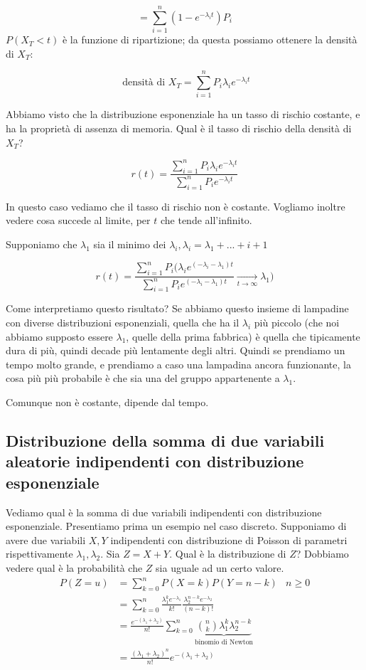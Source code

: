 \documentclass[a4paper,12pt]{book}
\begin{document}
$$ = \sum_{i=1}^{n} (1 - e^{-\lambda_i t}) P_i $$
$ P(X_T < t) $ è la funzione di ripartizione; da questa possiamo ottenere la densità di $ X_T $:

$$ \text{ densità di } X_T = \sum_{i=1}^{n} P_i \lambda_i e^{-\lambda_i t}$$

Abbiamo visto che la distribuzione esponenziale ha un tasso di rischio costante, e ha la proprietà di assenza di memoria. Qual è il tasso di rischio della densità di $ X_T $?

$$ r(t) = \frac{\sum_{i = 1}^{n} P_i \lambda_i e^{-\lambda_i t}}
			   {\sum_{i = 1}^{n} P_i e^{-\lambda_i t}} $$

In questo caso vediamo che il tasso di rischio non è costante. Vogliamo inoltre vedere cosa succede al limite, per $ t $ che tende all'infinito. 

Supponiamo che $\lambda_1$ sia il minimo dei $\lambda_i, \lambda_i = \lambda_1 + ... + i + 1$ 

$$ r(t) = \frac{\sum_{i = 1}^{n} P_i(\lambda_i e ^{(-\lambda_i - \lambda_1) t }}
{\sum_{i = 1}^{n} P_i e ^{(-\lambda_i - \lambda_1) t }} \underset{t \to \infty}{\longrightarrow} \lambda_1) $$

Come interpretiamo questo risultato? Se abbiamo questo insieme di lampadine con diverse distribuzioni esponenziali, quella che ha il $ \lambda_i $ più piccolo (che noi abbiamo supposto essere $\lambda_1$, quelle della prima fabbrica) è quella che tipicamente dura di più, quindi decade più lentamente degli altri. Quindi se prendiamo un tempo molto grande, e prendiamo a caso una lampadina ancora funzionante, la cosa più più probabile è che sia una del gruppo appartenente a $ \lambda_1 $.

Comunque non è costante, dipende dal tempo. 

\subsection{Distribuzione della somma di due variabili aleatorie indipendenti con distribuzione esponenziale}

Vediamo qual è la somma di due variabili indipendenti con distribuzione esponenziale. Presentiamo prima un esempio nel caso discreto. Supponiamo di avere due variabili $ X, Y $ indipendenti con distribuzione di Poisson di parametri rispettivamente $\lambda_1, \lambda_2$. Sia $ Z = X + Y $. Qual è la distribuzione di $ Z $? Dobbiamo vedere qual è la probabilità che $ Z $ sia uguale ad un certo valore. 
\begin{align*}
	P(Z = u) & = \sum_{k = 0}^{n} P(X = k)P(Y = n-k) & n \ge 0 \\
	& = \sum_{k=0}^{n} \frac{\lambda_1^k e^{-\lambda_1}} {k!} \frac{\lambda_2^{n-k} e^{-\lambda_2}}{(n-k)!} \\
	& = \frac{e^{-(\lambda_1 + \lambda_2)}}{n!} \sum_{k=0}^{n} \underbrace{\binom{n}{k} \lambda_1^k \lambda_2^{n-k}}_{\text{binomio di Newton}} \\
	& = \frac{(\lambda_1 + \lambda_2)^n}{n!} e^{-(\lambda_1 + \lambda_2)}
\end{align*}
\end{document}
